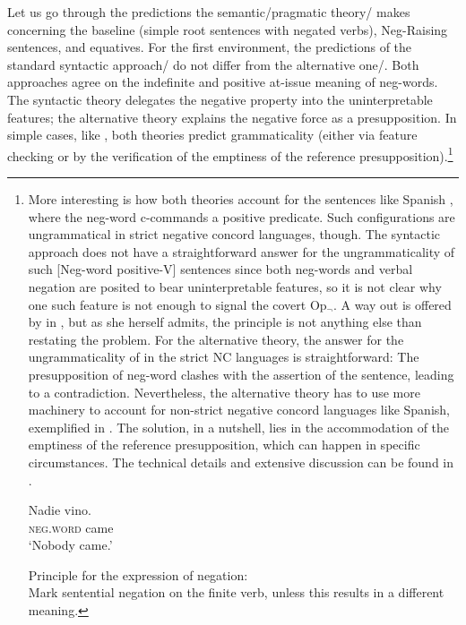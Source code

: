 \documentclass[output=paper,colorlinks,citecolor=brown]{langscibook}
\begin{document}
Let us go through the predictions the semantic/pragmatic theory/\citet{ovalle2004double} makes concerning the baseline (simple root sentences with ne\-gat\-ed verbs), Neg-Raising sentences, and equatives. For the first environment, the predictions of the standard syntactic approach/\citet{zeijlstra2004sentential} do not differ from the alternative one/\citet{ovalle2004double}. Both approaches agree on the indefinite and positive at-issue meaning of neg-words. The syntactic theory delegates the negative property into the uninterpretable features; the alternative theory explains the negative force as a presupposition. In simple cases, like , both theories predict grammaticality (either via feature checking or by the verification of the emptiness of the reference presupposition).\footnote{ More interesting is how both theories account for the sentences like Spanish , where the neg-word c-commands a positive predicate. Such configurations are ungrammatical in strict negative concord languages, though. The syntactic approach does not have a straightforward answer for the ungrammaticality of such [Neg-word positive-V] sentences since both neg-words and verbal negation are posited to bear uninterpretable features, so it is not clear why one such feature is not enough to signal the covert Op$_\neg$. A way out is offered by \citet{penka2007negative} in , but as she herself admits, the principle is not anything else than restating the problem. For the alternative theory, the answer for the ungrammaticality of  in the strict NC languages is straightforward: The presupposition of neg-word clashes with the assertion of the sentence, leading to a contradiction. Nevertheless, the alternative theory has to use more machinery to account for non-strict negative concord languages like Spanish, exemplified in . The solution, in a nutshell, lies in the accommodation of the emptiness of the reference presupposition, which can happen in specific circumstances. The technical details and extensive discussion can be found in \citet{kuhn2022dynamics}.

\ea\label{ex-neg-concord-sp}\gll Nadie vino.\\
\textsc{neg.word} came\\
\glt `Nobody came.'\z

\ea\label{ex-penka-principle}Principle for the expression of negation: \\
Mark sentential negation on the finite verb, unless this results in a different meaning.\z 
}
\end{document}
